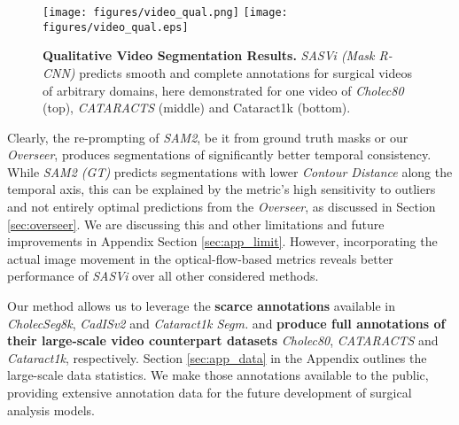 \begin{figure}[htbp]
    \centering
    \if{}
        \texttt{[image: figures/video\_qual.png]}
    \else
        \texttt{[image: figures/video\_qual.eps]}
    \fi
    \caption{\textbf{Qualitative Video Segmentation Results.} \emph{SASVi (Mask R-CNN)} predicts smooth and complete annotations for surgical videos of arbitrary domains, here demonstrated for one video of \emph{Cholec80} (top), \emph{CATARACTS} (middle) and Cataract1k (bottom).}
    \label{fig:video_qual}
\end{figure}

Clearly, the re-prompting of \emph{SAM2}, be it from ground truth masks or our \emph{Overseer}, produces segmentations of significantly better temporal consistency. While \emph{SAM2 (GT)} predicts segmentations with lower \emph{Contour Distance} along the temporal axis, this can be explained by the metric's high sensitivity to outliers and not entirely optimal predictions from the \emph{Overseer}, as discussed in Section \ref{sec:overseer}. We are discussing this and other limitations and future improvements in Appendix Section \ref{sec:app_limit}. However, incorporating the actual image movement in the optical-flow-based metrics reveals better performance of \emph{SASVi} over all other considered methods. 

Our method allows us to leverage the \textbf{scarce annotations} available in \emph{CholecSeg8k}, \emph{CadISv2} and \emph{Cataract1k Segm.} and \textbf{produce full annotations of their large-scale video counterpart datasets} \emph{Cholec80}, \emph{CATARACTS} and \emph{Cataract1k}, respectively. Section \ref{sec:app_data} in the Appendix outlines the large-scale data statistics. We make those annotations available to the public, providing extensive annotation data for the future development of surgical analysis models.
